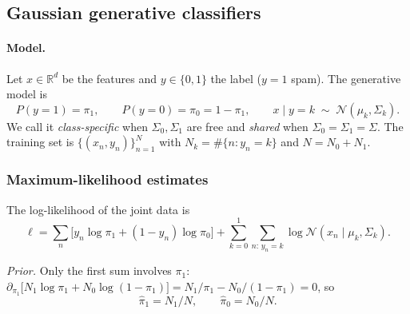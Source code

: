 \providecommand{\cFP}{c_{\mathrm{FP}}}
\providecommand{\cFN}{c_{\mathrm{FN}}}
\providecommand{\cI}{c_{\mathrm{I}}}
\providecommand{\logit}{\operatorname{logit}}
\providecommand{\tr}{\operatorname{tr}}

\subsection{Gaussian generative classifiers}\label{sec:t2}

\paragraph{Model.}
Let $x\in\mathbb{R}^d$ be the features and $y\in\{0,1\}$ the label ($y=1$ spam). The generative
model is
\begin{equation}
  P(y=1)=\pi_1,\qquad P(y=0)=\pi_0=1-\pi_1,\qquad x\mid y=k\;\sim\;\mathcal N(\mu_k,\Sigma_k).
  \label{eq:t2-model}
\end{equation}
We call it \emph{class-specific} when $\Sigma_0,\Sigma_1$ are free and \emph{shared} when
$\Sigma_0=\Sigma_1=\Sigma$. The training set is $\{(x_n,y_n)\}_{n=1}^N$ with
$N_k=\#\{n:y_n=k\}$ and $N=N_0+N_1$.

\subsubsection{Maximum-likelihood estimates}
The log-likelihood of the joint data is
\begin{equation}
  \ell=\sum_{n}\bigl[y_n\log\pi_1+(1-y_n)\log\pi_0\bigr]
      +\sum_{k=0}^{1}\sum_{n:\,y_n=k}\log\mathcal N(x_n\mid\mu_k,\Sigma_k).
  \label{eq:t2-ll}
\end{equation}

\emph{Prior.} Only the first sum involves $\pi_1$:
$\partial_{\pi_1}\bigl[N_1\log\pi_1+N_0\log(1-\pi_1)\bigr]=N_1/\pi_1-N_0/(1-\pi_1)=0$, so
\begin{equation}
  \hat\pi_1=N_1/N,\qquad \hat\pi_0=N_0/N.
\end{equation}


